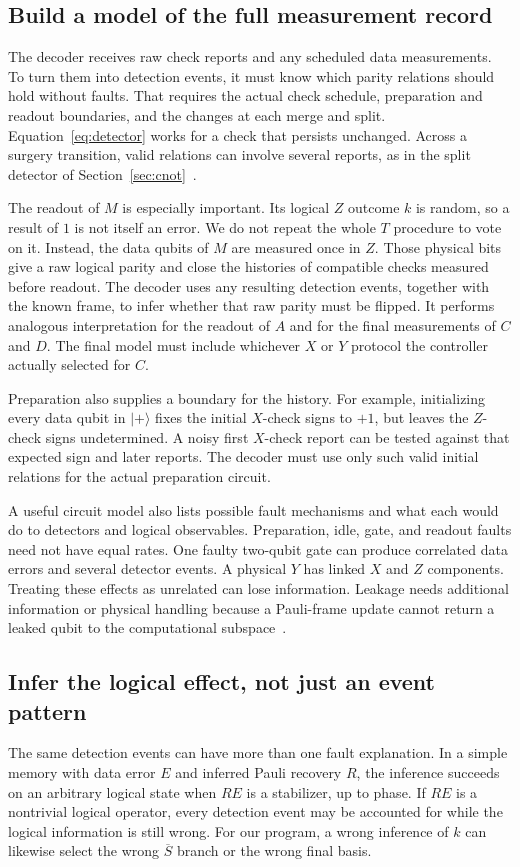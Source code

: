 \documentclass[11pt,a4paper]{article}
\newcommand{\ket}[1]{\lvert #1\rangle}
\begin{document}
\subsection{Build a model of the full measurement record}
The decoder receives raw check reports and any scheduled data measurements. To turn them into detection events, it must know which parity relations should hold without faults. That requires the actual check schedule, preparation and readout boundaries, and the changes at each merge and split. Equation~\eqref{eq:detector} works for a check that persists unchanged. Across a surgery transition, valid relations can involve several reports, as in the split detector of Section~\ref{sec:cnot}~\cite{stim}.

The readout of $M$ is especially important. Its logical $Z$ outcome $k$ is random, so a result of $1$ is not itself an error. We do not repeat the whole $T$ procedure to vote on it. Instead, the data qubits of $M$ are measured once in $Z$. Those physical bits give a raw logical parity and close the histories of compatible checks measured before readout. The decoder uses any resulting detection events, together with the known frame, to infer whether that raw parity must be flipped. It performs analogous interpretation for the readout of $A$ and for the final measurements of $C$ and $D$. The final model must include whichever $X$ or $Y$ protocol the controller actually selected for $C$.

Preparation also supplies a boundary for the history. For example, initializing every data qubit in $\ket+$ fixes the initial $X$-check signs to $+1$, but leaves the $Z$-check signs undetermined. A noisy first $X$-check report can be tested against that expected sign and later reports. The decoder must use only such valid initial relations for the actual preparation circuit.

A useful circuit model also lists possible fault mechanisms and what each would do to detectors and logical observables. Preparation, idle, gate, and readout faults need not have equal rates. One faulty two-qubit gate can produce correlated data errors and several detector events. A physical $Y$ has linked $X$ and $Z$ components. Treating these effects as unrelated can lose information. Leakage needs additional information or physical handling because a Pauli-frame update cannot return a leaked qubit to the computational subspace~\cite{leakage}.

\subsection{Infer the logical effect, not just an event pattern}
The same detection events can have more than one fault explanation. In a simple memory with data error $E$ and inferred Pauli recovery $R$, the inference succeeds on an arbitrary logical state when $RE$ is a stabilizer, up to phase. If $RE$ is a nontrivial logical operator, every detection event may be accounted for while the logical information is still wrong. For our program, a wrong inference of $k$ can likewise select the wrong $\overline S$ branch or the wrong final basis.
\end{document}
